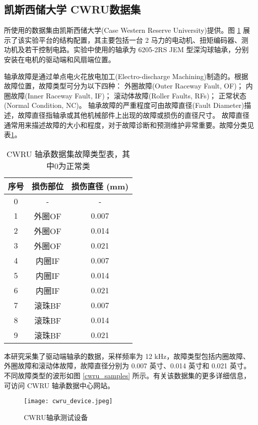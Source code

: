 \documentclass[master]{thesis-uestc}
\begin{document}
\subsection{凯斯西储大学 CWRU数据集}
所使用的数据集由凯斯西储大学(Case Western Reserve University)提供。图 \ref{cwru_device} 展示了该实验平台的结构配置，其主要包括一台 2 马力的电动机、扭矩编码器、测功机及若干控制电路。实验中使用的轴承为 6205-2RS JEM 型深沟球轴承，分别安装在电机的驱动端和风扇端位置。

轴承故障是通过单点电火花放电加工(Electro-discharge Machining)制造的。根据故障位置，故障类型可分为以下四种：  
外圈故障(Outer Raceway Fault, OF)；  
内圈故障(Inner Raceway Fault, IF)；  
滚动体故障(Roller Faults, RFs)；  
正常状态(Normal Condition, NC)。  
轴承故障的严重程度可由故障直径(Fault Diameter)描述，故障直径指轴承或其他机械部件上出现的故障或损伤的直径尺寸。 故障直径通常用来描述故障的大小和程度，对于故障诊断和预测维护非常重要。故障分类见表\ref{tab:cwru_fault_types}。
\begin{table}[H]
    \centering
    \caption{CWRU 轴承数据集故障类型表，其中0为正常类}
    \renewcommand\arraystretch{1.2}
    \begin{tabular}{ccc}
        \toprule
        序号 & 损伤部位 & 损伤直径 (mm) \\
        \midrule
        0  & - & - \\        
        1  & 外圈OF & 0.007 \\
        2  & 外圈OF & 0.014 \\
        3  & 外圈OF & 0.021 \\
        4  & 内圈IF & 0.007 \\
        5  & 内圈IF & 0.014 \\
        6  & 内圈IF & 0.021 \\
        7  & 滚珠BF & 0.007 \\
        8  & 滚珠BF & 0.014 \\
        9  & 滚珠BF & 0.021 \\
        \bottomrule
    \end{tabular}
    \label{tab:cwru_fault_types}
\end{table}

本研究采集了驱动端轴承的数据，采样频率为 12 kHz，故障类型包括内圈故障、外圈故障和滚动体故障，故障直径分别为 0.007 英寸、0.014 英寸和 0.021 英寸。不同故障类型的波形如图 \ref{cwru_samples} 所示。有关该数据集的更多详细信息，可访问 CWRU 轴承数据中心网站。  

\begin{figure}[h]
    \centering
    \texttt{[image: cwru\_device.jpeg]}
    \caption{CWRU轴承测试设备}
    \label{cwru_device}
\end{figure}
\end{document}
